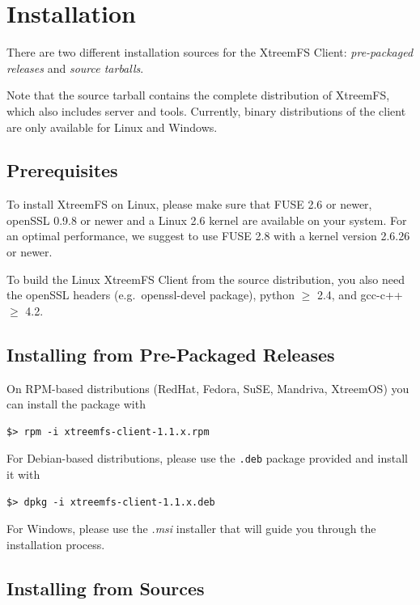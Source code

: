 \documentclass[a4paper,10pt]{book}
\begin{document}
\section{Installation}

There are two different installation sources for the XtreemFS Client: \emph{pre-packaged releases} and \emph{source tarballs}.

Note that the source tarball contains the complete distribution of XtreemFS, which also includes server and tools. Currently, binary distributions of the client are only available for Linux and Windows.

\subsection{Prerequisites}

To install XtreemFS on Linux, please make sure that FUSE 2.6 or newer, openSSL 0.9.8 or newer and a Linux 2.6 kernel are available on your system. For an optimal performance, we suggest to use FUSE 2.8 with a kernel version 2.6.26 or newer.

To build the Linux XtreemFS Client from the source distribution, you also need the openSSL headers (e.g.\ openssl-devel package), python $\geq$ 2.4, and gcc-c++ $\geq$ 4.2.

\subsection{Installing from Pre-Packaged Releases}

On RPM-based distributions (RedHat, Fedora, SuSE, Mandriva, XtreemOS) you can install the package with

\begin{verbatim}
$> rpm -i xtreemfs-client-1.1.x.rpm
\end{verbatim}


For Debian-based distributions, please use the \texttt{.deb} package provided and install it with

\begin{verbatim}
$> dpkg -i xtreemfs-client-1.1.x.deb
\end{verbatim}


For Windows, please use the \emph{.msi} installer that will guide you through the installation process.

\subsection{Installing from Sources}
\end{document}
